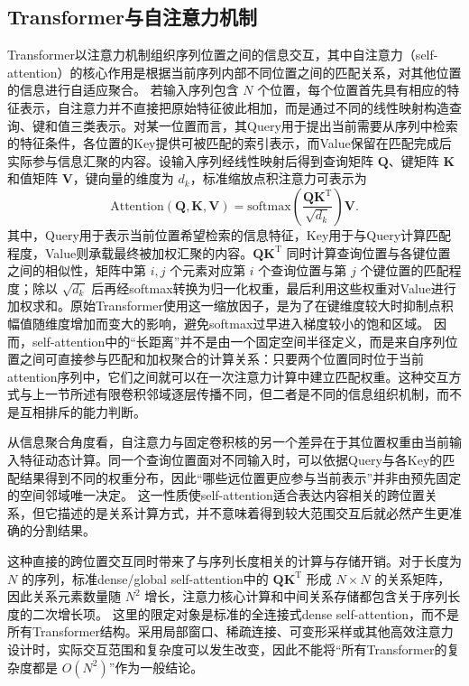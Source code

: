 \subsection{Transformer与自注意力机制}

Transformer以注意力机制组织序列位置之间的信息交互，其中自注意力（self-attention）的核心作用是根据当前序列内部不同位置之间的匹配关系，对其他位置的信息进行自适应聚合。\cite{vaswani2017attention} 若输入序列包含 \(N\) 个位置，每个位置首先具有相应的特征表示，自注意力并不直接把原始特征彼此相加，而是通过不同的线性映射构造查询、键和值三类表示。对某一位置而言，其Query用于提出当前需要从序列中检索的特征条件，各位置的Key提供可被匹配的索引表示，而Value保留在匹配完成后实际参与信息汇聚的内容。设输入序列经线性映射后得到查询矩阵 \(\mathbf Q\)、键矩阵 \(\mathbf K\) 和值矩阵 \(\mathbf V\)，键向量的维度为 \(d_k\)，标准缩放点积注意力可表示为
\begin{equation}
\label{eq:ch2-self-attention}
\mathrm{Attention}(\mathbf Q,\mathbf K,\mathbf V)
=
\mathrm{softmax}\left(
\frac{\mathbf Q\mathbf K^{\mathrm T}}{\sqrt{d_k}}
\right)\mathbf V.
\end{equation}
其中，Query用于表示当前位置希望检索的信息特征，Key用于与Query计算匹配程度，Value则承载最终被加权汇聚的内容。\(\mathbf Q\mathbf K^{\mathrm T}\) 同时计算查询位置与各键位置之间的相似性，矩阵中第 \(i,j\) 个元素对应第 \(i\) 个查询位置与第 \(j\) 个键位置的匹配程度；除以 \(\sqrt{d_k}\) 后再经softmax转换为归一化权重，最后利用这些权重对Value进行加权求和。原始Transformer使用这一缩放因子，是为了在键维度较大时抑制点积幅值随维度增加而变大的影响，避免softmax过早进入梯度较小的饱和区域。\cite{vaswani2017attention} 因而，self-attention中的“长距离”并不是由一个固定空间半径定义，而是来自序列位置之间可直接参与匹配和加权聚合的计算关系：只要两个位置同时位于当前attention序列中，它们之间就可以在一次注意力计算中建立匹配权重。这种交互方式与上一节所述有限卷积邻域逐层传播不同，但二者是不同的信息组织机制，而不是互相排斥的能力判断。

从信息聚合角度看，自注意力与固定卷积核的另一个差异在于其位置权重由当前输入特征动态计算。同一个查询位置面对不同输入时，可以依据Query与各Key的匹配结果得到不同的权重分布，因此“哪些远位置更应参与当前表示”并非由预先固定的空间邻域唯一决定。\cite{vaswani2017attention} 这一性质使self-attention适合表达内容相关的跨位置关系，但它描述的是关系计算方式，并不意味着得到较大范围交互后就必然产生更准确的分割结果。

这种直接的跨位置交互同时带来了与序列长度相关的计算与存储开销。对于长度为 \(N\) 的序列，标准dense/global self-attention中的 \(\mathbf Q\mathbf K^{\mathrm T}\) 形成 \(N\times N\) 的关系矩阵，因此关系元素数量随 \(N^2\) 增长，注意力核心计算和中间关系存储都包含关于序列长度的二次增长项。\cite{vaswani2017attention} 这里的限定对象是标准的全连接式dense self-attention，而不是所有Transformer结构。采用局部窗口、稀疏连接、可变形采样或其他高效注意力设计时，实际交互范围和复杂度可以发生改变，因此不能将“所有Transformer的复杂度都是 \(O(N^2)\)”作为一般结论。

